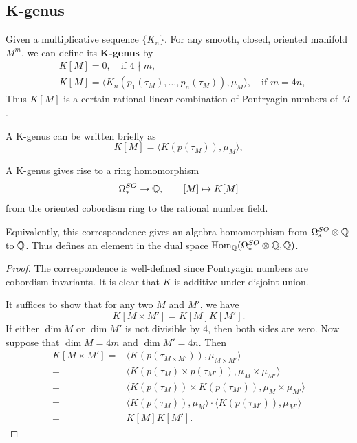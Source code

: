 \subsection{K-genus}
\begin{definition}
    Given a multiplicative sequence $\{K_n\}$. For any smooth, closed, oriented manifold $M^m$, 
    we can define its \textbf{K-genus} by 
    \begin{align*}
        &K[M] = 0, \quad \text{if $4 \nmid m$}, \\
        &K[M] = \langle K_{n}(p_1(\tau_M), \dots, p_n(\tau_M)), \mu_M \rangle, \quad \text{if } m=4n,
    \end{align*}
    Thus $K[M]$ is a certain rational linear combination of Pontryagin numbers of $M$.
\end{definition}
\begin{remark}
    A K-genus can be written briefly as 
    \begin{equation*}
        K[M] = \langle K(p(\tau_M)), \mu_M \rangle,
    \end{equation*}
\end{remark}
\begin{lemma}
    A K-genus gives rise to a ring homomorphism 
    \begin{equation*}
        \Omega_*^{SO} \to \mathbb{Q},\qquad [M] \mapsto K[M]
    \end{equation*}
    from the oriented cobordism ring to the rational number field. 

    Equivalently, this correspondence gives an algebra homomorphism from $\Omega_*^{SO} \otimes \mathbb{Q}$ to $\mathbb{Q}$. 
    Thus defines an element in the dual space $\mathrm{Hom}_{\mathbb{Q}}(\Omega_*^{SO} \otimes \mathbb{Q}, \mathbb{Q})$.
\end{lemma}
\begin{proof}
    The correspondence is well-defined since Pontryagin numbers are cobordism invariants.
    It is clear that $K$ is additive under disjoint union.
    
    It suffices to show that for any two $M$ and $M'$, we have 
    \begin{equation*}
        K[M \times M'] = K[M] K[M'].
    \end{equation*}
    If either $\dim M$ or $\dim M'$ is not divisible by 4, then both sides are zero. 
    Now suppose that $\dim M = 4m$ and $\dim M' = 4n$. Then 
    \begin{align*}
        K[M \times M'] =& \langle K(p(\tau_{M \times M'})), \mu_{M \times M'} \rangle \\
        =& \langle K(p(\tau_M) \times p(\tau_{M'})), \mu_M \times \mu_{M'} \rangle \\
        =& \langle K(p(\tau_M))\times K(p(\tau_{M'})), \mu_M \times \mu_{M'} \rangle \\
        =& \langle K(p(\tau_M)), \mu_M \rangle \cdot \langle K(p(\tau_{M'})), \mu_{M'} \rangle \\
        =& K[M] K[M'].
    \end{align*}
\end{proof}

